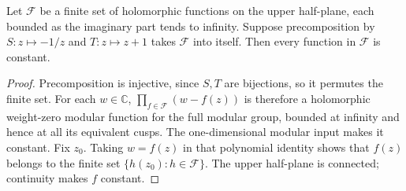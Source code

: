 \begin{srlemma}
\label{lem:ftb-finite-elliptic-family}
Let \(\mathcal F\) be a finite set of holomorphic functions on
the upper half-plane, each bounded as the imaginary part tends
to infinity.  Suppose precomposition by \(S:z\mapsto-1/z\)
and \(T:z\mapsto z+1\) takes \(\mathcal F\) into itself.
Then every function in \(\mathcal F\) is constant.
\end{srlemma}
\begin{proof}
Precomposition is injective, since \(S,T\) are bijections, so it
permutes the finite set.
For each \(w\in\mathbb C\),
\(\prod_{f\in\mathcal F}(w-f(z))\) is therefore a holomorphic
weight-zero modular function for the full modular group, bounded
at infinity and hence at all its equivalent cusps.
The one-dimensional modular input makes it constant.
Fix \(z_0\).  Taking \(w=f(z)\) in that polynomial identity shows
that \(f(z)\) belongs to the finite set
\(\{h(z_0):h\in\mathcal F\}\).
The upper half-plane is connected; continuity makes \(f\)
constant.
\end{proof}

